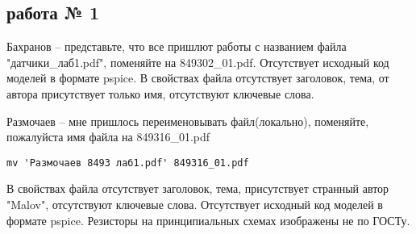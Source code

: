 \documentclass[a4paper,landscape,11pt]{article}
\begin{document}
\subsection{работа № 1}
Бахранов  -- представьте, что все пришлют работы с названием файла "датчики\_лаб1.pdf", поменяйте на  849302\_01.pdf. Отсутствует исходный код моделей в формате pspice.
В свойствах файла отсутствует заголовок, тема, от автора присутствует только имя, отсутствуют ключевые слова.

Размочаев -- мне пришлось переименовывать файл(локально), поменяйте, пожалуйста имя файла на  849316\_01.pdf
\begin{verbatim}
mv 'Размочаев 8493 лаб1.pdf' 849316_01.pdf
\end{verbatim}
В свойствах файла отсутствует заголовок, тема, присутствует странный автор "Malov", отсутствуют ключевые слова. Отсутствует исходный код моделей в формате pspice.
Резисторы на принципиальных схемах изображены не по ГОСТу.
\end{document}
